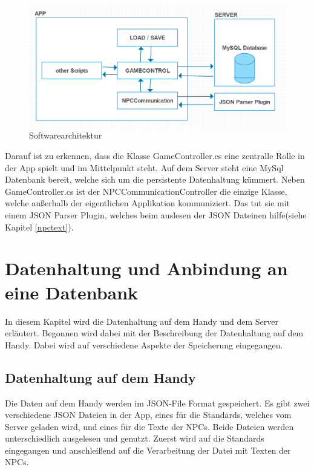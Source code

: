 			\begin{figure}[htbp]
				\centering 
				\label{architecture}
				\includegraphics[width=13cm]{pics/archtecture.png}
				\caption{Softwarearchitektur}
			\end{figure}	
			
Darauf ist zu erkennen, dass die Klasse GameController.cs eine zentralle Rolle in der App spielt und im Mittelpunkt steht. Auf dem Server steht eine MySql Datenbank bereit, welche sich um die persistente Datenhaltung kümmert. Neben GameController.cs ist der NPCCommunicationController die einzige Klasse, welche außerhalb der eigentlichen Applikation kommuniziert. Das tut sie mit einem JSON Parser Plugin, welches beim auslesen der JSON Dateinen hilfe(siehe Kapitel \ref{npctext}).	

\section{Datenhaltung und Anbindung an eine Datenbank}

In diesem Kapitel wird die Datenhaltung auf dem Handy und dem Server erläutert. Begonnen wird dabei mit der Beschreibung der Datenhaltung auf dem Handy. Dabei wird auf verschiedene Aspekte der Speicherung eingegangen.

\subsection{Datenhaltung auf dem Handy}

Die Daten auf dem Handy werden im JSON-File Format gespeichert. Es gibt zwei verschiedene JSON Dateien in der App, eines für die Standards, welches vom Server geladen wird, und eines für die Texte der NPCs. Beide Dateien werden unterschiedlich ausgelesen und genutzt. Zuerst wird auf die Standards eingegangen und anschleißend auf die Verarbeitung der Datei mit Texten der NPCs. 
	
